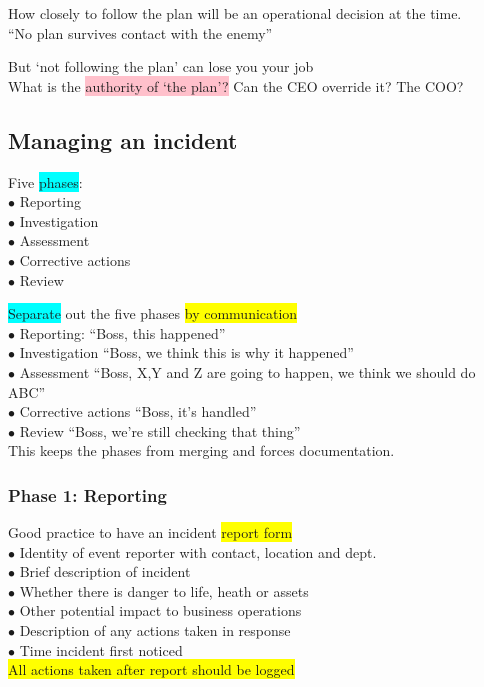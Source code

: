 \documentclass[tikz,border=10pt]{project_plan}
\newcommand{\bulletPoint}{\hspace{-3.1pt}$\bullet$ \hspace{5pt}}
\begin{document}
How closely to follow the plan will be an operational decision at the time. \\
“No plan survives contact with the enemy”

But ‘not following the plan’ can lose you your job\\
What is the \colorbox{pink}{authority of ‘the plan’?} Can the CEO override it?  The COO?

\subsection{Managing an incident}

Five \colorbox{cyan}{phases}: \\
\bulletPoint Reporting\\
\bulletPoint Investigation\\
\bulletPoint Assessment\\
\bulletPoint Corrective actions\\
\bulletPoint Review

\colorbox{cyan}{Separate} out the five phases \colorbox{yellow}{by communication} \\
\bulletPoint Reporting: “Boss, this happened” \\
\bulletPoint Investigation “Boss, we think this is why it happened”\\
\bulletPoint Assessment “Boss, X,Y and Z are going to happen, we think we should do ABC” \\
\bulletPoint Corrective actions “Boss, it’s handled” \\
\bulletPoint Review “Boss, we’re still checking that thing” \\
This keeps the phases from merging and forces documentation.


\subsubsection{Phase 1: Reporting}

Good practice to have an incident \colorbox{yellow}{report form}\\
\bulletPoint Identity of event reporter with contact, location and dept.\\
\bulletPoint Brief description of incident\\
\bulletPoint Whether there is danger to life, heath or assets\\
\bulletPoint Other potential impact to business operations\\
\bulletPoint Description of any actions taken in response\\
\bulletPoint Time incident first noticed\\
\colorbox{yellow}{All actions taken after report should be logged}
\end{document}
